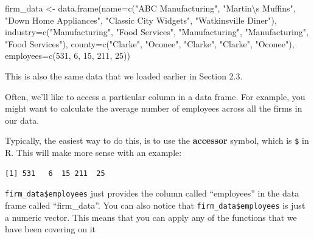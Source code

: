 \documentclass[
  letterpaper,
  DIV=11,
  numbers=noendperiod]{scrreprt}
\newenvironment{Shaded}{\begin{snugshade}}{\end{snugshade}}
\newcommand{\AttributeTok}[1]{\textcolor[rgb]{0.40,0.45,0.13}{#1}}
\newcommand{\DecValTok}[1]{\textcolor[rgb]{0.68,0.00,0.00}{#1}}
\newcommand{\FunctionTok}[1]{\textcolor[rgb]{0.28,0.35,0.67}{#1}}
\newcommand{\NormalTok}[1]{\textcolor[rgb]{0.00,0.23,0.31}{#1}}
\newcommand{\OtherTok}[1]{\textcolor[rgb]{0.00,0.23,0.31}{#1}}
\newcommand{\SpecialCharTok}[1]{\textcolor[rgb]{0.37,0.37,0.37}{#1}}
\newcommand{\StringTok}[1]{\textcolor[rgb]{0.13,0.47,0.30}{#1}}
\begin{document}
\begin{Shaded}
\begin{Highlighting}[]
\NormalTok{firm\_data }\OtherTok{\textless{}{-}} \FunctionTok{data.frame}\NormalTok{(}\AttributeTok{name=}\FunctionTok{c}\NormalTok{(}\StringTok{"ABC Manufacturing"}\NormalTok{, }\StringTok{"Martin}\SpecialCharTok{\textbackslash{}\textquotesingle{}}\StringTok{s Muffins"}\NormalTok{, }\StringTok{"Down Home Appliances"}\NormalTok{, }\StringTok{"Classic City Widgets"}\NormalTok{, }\StringTok{"Watkinsville Diner"}\NormalTok{),}
                        \AttributeTok{industry=}\FunctionTok{c}\NormalTok{(}\StringTok{"Manufacturing"}\NormalTok{, }\StringTok{"Food Services"}\NormalTok{, }\StringTok{"Manufacturing"}\NormalTok{, }\StringTok{"Manufacturing"}\NormalTok{, }\StringTok{"Food Services"}\NormalTok{),}
                        \AttributeTok{county=}\FunctionTok{c}\NormalTok{(}\StringTok{"Clarke"}\NormalTok{, }\StringTok{"Oconee"}\NormalTok{, }\StringTok{"Clarke"}\NormalTok{, }\StringTok{"Clarke"}\NormalTok{, }\StringTok{"Oconee"}\NormalTok{),}
                        \AttributeTok{employees=}\FunctionTok{c}\NormalTok{(}\DecValTok{531}\NormalTok{, }\DecValTok{6}\NormalTok{, }\DecValTok{15}\NormalTok{, }\DecValTok{211}\NormalTok{, }\DecValTok{25}\NormalTok{))}
\end{Highlighting}
\end{Shaded}

This is also the same data that we loaded earlier in Section 2.3.

Often, we'll like to access a particular column in a data frame. For
example, you might want to calculate the average number of employees
across all the firms in our data.

Typically, the easiest way to do this, is to use the \textbf{accessor}
symbol, which is \texttt{\$} in R. This will make more sense with an
example:

\begin{Shaded}
\end{Shaded}

\begin{verbatim}
[1] 531   6  15 211  25
\end{verbatim}

\texttt{firm\_data\$employees} just provides the column called
``employees'' in the data frame called ``firm\_data''. You can also
notice that \texttt{firm\_data\$employees} is just a numeric vector.
This means that you can apply any of the functions that we have been
covering on it
\end{document}
